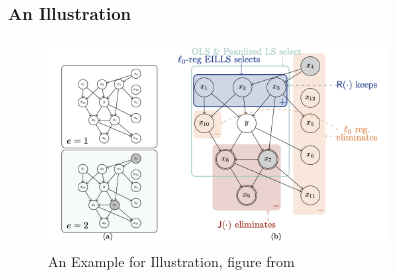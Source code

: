 \begin{frame}
  \frametitle{An Illustration}
  \begin{figure}[H]
      \centering \includegraphics[width=0.8\textwidth]{figs/example}
      \caption{An Example for Illustration, figure from \cite{fan2023environmentinvariantlinearsquares}}
    \end{figure}
\end{frame}
